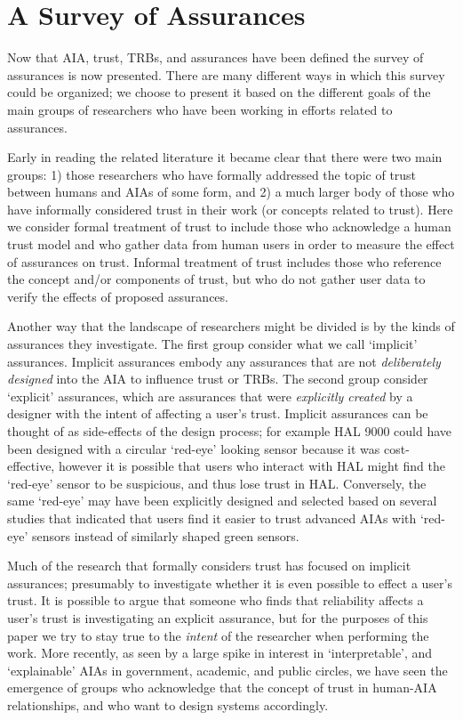 

\section{A Survey of Assurances} \label{sec:survey}
Now that AIA, trust, TRBs, and assurances have been defined the survey of assurances is now presented. There are many different ways in which this survey could be organized; we choose to present it based on the different goals of the main groups of researchers who have been working in efforts related to assurances.

Early in reading the related literature it became clear that there were two main groups: 1) those researchers who have formally addressed the topic of trust between humans and AIAs of some form, and 2) a much larger body of those who have informally considered trust in their work (or concepts related to trust). Here we consider formal treatment of trust to include those who acknowledge a human trust model and who gather data from human users in order to measure the effect of assurances on trust. Informal treatment of trust includes those who reference the concept and/or components of trust, but who do not gather user data to verify the effects of proposed assurances. 

Another way that the landscape of researchers might be divided is by the kinds of assurances they investigate. The first group consider what we call `implicit' assurances. Implicit assurances embody any assurances that are not \emph{deliberately designed} into the AIA to influence trust or TRBs. The second group consider `explicit' assurances, which are assurances that were \emph{explicitly created} by a designer with the intent of affecting a user's trust. Implicit assurances can be thought of as side-effects of the design process; for example HAL 9000 could have been designed with a circular `red-eye' looking sensor because it was cost-effective, however it is possible that users who interact with HAL might find the `red-eye' sensor to be suspicious, and thus lose trust in HAL. Conversely, the same `red-eye' may have been explicitly designed and selected based on several studies that indicated that users find it easier to trust advanced AIAs with `red-eye' sensors instead of similarly shaped green sensors.

Much of the research that formally considers trust has focused on implicit assurances; presumably to investigate whether it is even possible to effect a user's trust. It is possible to argue that someone who finds that reliability affects a user's trust is investigating an explicit assurance, but for the purposes of this paper we try to stay true to the \emph{intent} of the researcher when performing the work. More recently, as seen by a large spike in interest in `interpretable', and `explainable' AIAs in government, academic, and public circles, we have seen the emergence of groups who acknowledge that the concept of trust in human-AIA relationships, and who want to design systems accordingly.

